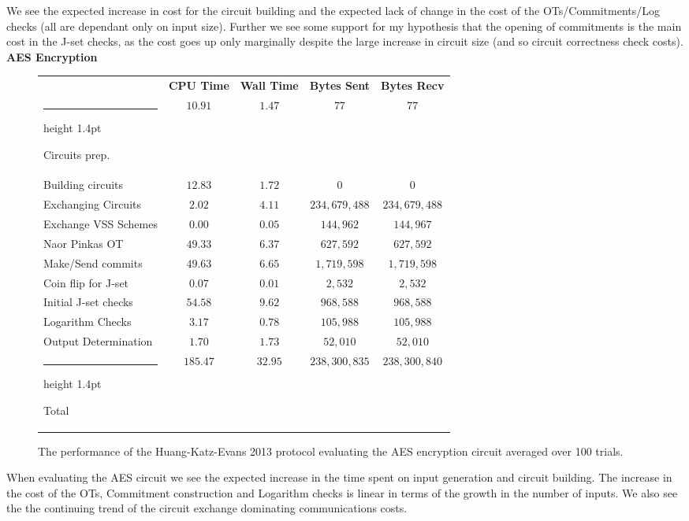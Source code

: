 \documentclass[11pt]{article} %
\makeatletter
\newcommand{\thickhline}{%
    \noalign {\ifnum 0=`}\fi \hrule height 1.4pt
    \futurelet \reserved@a \@xhline
}
\makeatother
\begin{document}
				We see the expected increase in cost for the circuit building and the expected lack of change in the cost of the OTs/Commitments/Log checks (all are dependant only on input size). Further we see some support for my hypothesis that the opening of commitments is the main cost in the J-set checks, as the cost goes up only marginally despite the large increase in circuit size (and so circuit correctness check costs).\\

				\FloatBarrier
				\noindent \textbf{AES Encryption}
				\begin{figure}[!ht]
					\begin{tabular}{| p{4.3cm} | c c c c |}
						\hline
						& \textbf{CPU Time} & \textbf{Wall Time} & \textbf{Bytes Sent} & \textbf{Bytes Recv} \\
						\thickhline
						Circuits prep. & $10.91$ & $1.47$ & $77$ & $77$ \\
						\hline
						Building circuits & $12.83$ & $1.72$ & $0$ & $0$ \\
						\hline
						Exchanging Circuits & $2.02$ & $4.11$ & $234,679,488$ & $234,679,488$ \\
						\hline
						Exchange VSS Schemes & $0.00$ & $0.05$ & $144,962$ & $144,967$ \\
						\hline
						Naor Pinkas OT & $49.33$ & $6.37$ & $627,592$ & $627,592$ \\
						\hline
						Make/Send commits & $49.63$ & $6.65$ & $1,719,598$ & $1,719,598$ \\
						\hline
						Coin flip for J-set & $0.07$ & $0.01$ & $2,532$ & $2,532$ \\
						\hline
						Initial J-set checks & $54.58$ & $9.62$ & $968,588$ & $968,588$ \\
						\hline
						Logarithm Checks & $3.17$ & $0.78$ & $105,988$ & $105,988$ \\
						\hline
						Output Determination & $1.70$ & $1.73$ & $52,010$ & $52,010$ \\
						\thickhline
						Total & $185.47$ & $32.95$ & $238,300,835$ & $238,300,840$ \\
						\hline
					\end{tabular}
					\caption{The performance of the Huang-Katz-Evans 2013 protocol evaluating the AES encryption circuit averaged over 100 trials.\label{table:HKE_2013_AES}}
				\end{figure}

				When evaluating the AES circuit we see the expected increase in the time spent on input generation and circuit building. The increase in the cost of the OTs, Commitment construction and Logarithm checks is linear in terms of the growth in the number of inputs. We also see the the continuing trend of the circuit exchange dominating communications costs.\\
\end{document}
